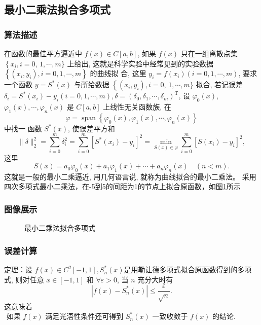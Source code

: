 \documentclass{ctexart}%
\begin{document}
\subsection{最小二乘法拟合多项式}
\subsubsection{算法描述}
在函数的最佳平方逼近中 $f(x) \in C[a, b]$, 如果 $f(x)$ 只在一组离散点集 $\left\{x_{i}, i=0\right.$, $1, \cdots, m\}$ 上给出, 这就是科学实验中经常见到的实验数据 $\left\{\left(x_{i}, y_{i}\right), i=0,1, \cdots, m\right\}$ 的曲线拟 合, 这里 $y_{i}=f\left(x_{i}\right)(i=0,1, \cdots, m)$, 要求一个函数 $y=S^{*}(x)$ 与所给数据 $\left\{\left(x_{i}, y_{i}\right), i=0\right.$, $1, \cdots, m\}$ 拟合, 若记误差 $\delta_{i}=S^{*}\left(x_{i}\right)-y_{i}(i=0,1, \cdots, m), \delta=\left(\delta_{0}, \delta_{1}, \cdots, \delta_{m}\right)^{\mathrm{T}}$, 设 $\varphi_{0}(x)$, $\varphi_{1}(x), \cdots, \varphi_{n}(x)$ 是 $C[a, b]$ 上线性无关函数族, 在 $$\varphi=\operatorname{span}\left\{\varphi_{0}(x),  \varphi_{1}(x), \cdots, \varphi_{n}(x)\right\}$$ 中找一 函数 $S^{*}(x)$, 使误差平方和
$$
\|\delta\|_{2}^{2}=\sum_{i=0}^{m} \delta_{i}^{2}=\sum_{i=0}^{m}\left[S^{*}\left(x_{i}\right)-y_{i}\right]^{2}=\min _{S(x) \in \varphi} \sum_{i=0}^{m}\left[S\left(x_{i}\right)-y_{i}\right]^{2},
$$
这里
$$
S(x)=a_{0} \varphi_{0}(x)+a_{1} \varphi_{1}(x)+\cdots+a_{n} \varphi_{n}(x) \quad(n<m) .
$$
这就是一般的最小二乘逼近, 用几何语言说, 就称为曲线拟合的最小二乘法。
采用四次多项式最小二乘法，在-5到5的间距为1的节点上拟合原函数，如图\ref{least_squares}所示
\subsubsection{图像展示}
\begin{figure}[H]
    \centering
    
    \caption{最小二乘法拟合多项式}
    \label{least_squares}
\end{figure}

\subsubsection{误差计算}
定理：设 $f(x) \in C^{2}[-1,1], S_{n}^{*}(x)$是用勒让德多项式拟合原函数得到的多项式, 则对任意 $x \in[-1,1]$ 和 $\forall \varepsilon>0$, 当 $n$ 充分大时有
$$
\left|f(x)-S_{n}^{*}(x)\right| \leqslant \frac{\varepsilon}{\sqrt{n}} .
$$
这意味着$
\text { 如果 } f(x) \text { 满足光浯性条件还可得到 } S_{n}^{*}(x) \text { 一致收敛于 } f(x) \text { 的结论. }
$
\end{document}
